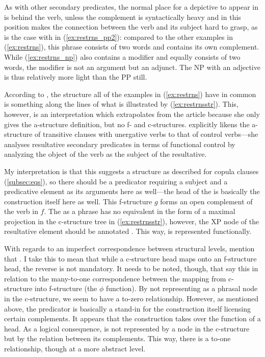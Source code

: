 As with other secondary predicates, the normal place for a depictive to appear
in is behind the verb, unless the complement is syntactically heavy and in this
position makes the connection between the verb and its subject hard to grasp,
as is the case with  in
(\ref{ex:restrns_pp2}): compared to the other examples in (\ref{ex:restrns}),
this phrase consists of two words and contains its own complement. While
(\ref{ex:restrns_np}) also contains a modifier and equally consists of two
words, the modifier is not an argument but an adjunct. The NP with an adjective
is thus relatively more light than the PP still.

According to \citet{simpson1983}, the structure all of the examples in
(\ref{ex:restrns}) have in common is something along the lines of what is
illustrated by (\ref{ex:restrnsstr}). This, however, is an interpretation which
extrapolates from the article because she only gives the a-structure
definition, but no f- and c-structures. \citet{simpson1983} explicitly likens
the a-structure of transitive clauses with unergative verbs to that of
control verbs---she analyses resultative secondary predicates in terms of
functional control by analyzing the object of the verb as the subject of the
resultative.

My interpretation is that this suggests a structure as described for copula
clauses (\autoref{subsec:eqs}), so there should be a  predicator
requiring a subject and a predicative element as its arguments here as
well---the head of the \XCompl{} is basically the construction itself here as
well. This f-structure $g$ forms an open complement of the verb in $f$. The
\XCompl{} as a phrase has no equivalent in the form of a maximal projection in
the c-structure tree in (\ref{ex:restrnsstr}), however, the XP node of the
resultative element should be annotated \pass{\XCompl{} \Plink}. This way,
\XCompl{} is represented functionally.

With regards to an imperfect correspondence between structural levels,
\citet{bresnan2016} mention that . I take this to mean that
while a c-structure head maps onto an f-structure head, the reverse is not
mandatory. It needs to be noted, though, that \citet{bresnan2016} say this in
relation to the many-to-one correspondence between the mapping from c-structure
into f-structure (the $\phi$ function). By not representing \XCompl{} as a
phrasal node in the c-structure, we seem to have a to-zero relationship.
However, as mentioned above, the  predicator is basically a
stand-in for the construction itself licensing certain complements. It appears
that the construction takes over the function of a head. As a logical
consequence, \ups{\XCompl{} \Pred{}} is not represented by a node in the
c-structure but by the relation between its complements. This way, there is a
to-one relationship, though at a more abstract level.


